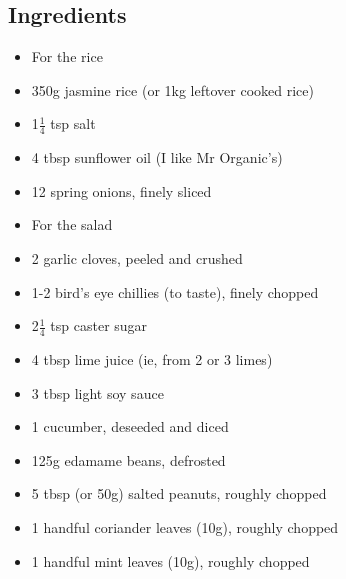\documentclass{book}
\begin{document}
\subsection*{Ingredients}
\begin{itemize}
\item For the rice
\item 350g jasmine rice (or 1kg leftover cooked rice)
\item 1$\frac{1}{4}$ tsp salt
\item 4 tbsp sunflower oil (I like Mr Organic’s)
\item 12 spring onions, finely sliced
\end{itemize}

\begin{itemize}
\item For the salad
\item 2 garlic cloves, peeled and crushed
\item 1-2 bird’s eye chillies (to taste), finely chopped
\item 2$\frac{1}{4}$ tsp caster sugar
\item 4 tbsp lime juice (ie, from 2 or 3 limes)
\item 3 tbsp light soy sauce
\item 1 cucumber, deseeded and diced
\item 125g edamame beans, defrosted
\item 5 tbsp (or 50g) salted peanuts, roughly chopped
\item 1 handful coriander leaves (10g), roughly chopped
\item 1 handful mint leaves (10g), roughly chopped
\end{itemize}
\end{document}

